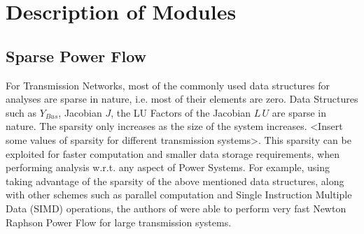 \documentclass[varwidth]{standalone}
\begin{document}
\section{Description of Modules}

\subsection{Sparse Power Flow}
    For Transmission Networks, most of the commonly used data structures for analyses are sparse in nature, i.e. most of their elements are zero. Data Structures such as $Y_{Bus}$, Jacobian $J$, the LU Factors of the Jacobian $L \, U$ are sparse in nature. The sparsity only increases as the size of the system increases. <Insert some values of sparsity for different transmission systems>. This sparsity can be exploited for faster computation and smaller data storage requirements, when performing analysis w.r.t. any aspect of Power Systems. For example, using taking advantage of the sparsity of the above mentioned data structures, along with other schemes such as parallel computation and Single Instruction Multiple Data (SIMD) operations, the authors of \cite{Ahmadi2021Sep} were able to perform very fast Newton Raphson Power Flow for large transmission systems.
\end{document}
